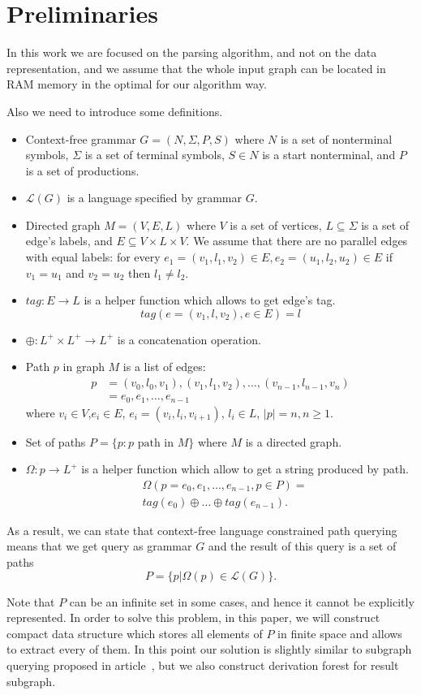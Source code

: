 \section{Preliminaries}

In this work we are focused on the parsing algorithm, and not on the data representation, and we assume that the whole input graph can be located in RAM memory in the optimal for our algorithm way.

Also we need to introduce some definitions.
\begin{itemize}
  \item Context-free grammar $G=(N, \Sigma, P, S)$ where $N$ is a set of nonterminal symbols, $\Sigma$ is a set of terminal symbols, $S \in N$ is a start nonterminal, and $P$ is a set of productions. 
  \item $\mathcal{L}(G)$ is a language specified by grammar $G$.
  \item Directed graph $M = (V,E,L)$ where $V$ is a set of vertices, $L \subseteq \Sigma$ is a set of edge's labels, and $E\subseteq V\times L\times V$. 
  We assume that there are no parallel edges with equal labels: for every $e_1=(v_1,l_1,v_2) \in E, e_2=(u_1,l_2,u_2) \in E$ if $v_1 = u_1$ and $v_2 = u_2$ then $l_1 \neq l_2$.
  \item $tag: E \rightarrow L$ is a helper function which allows to get edge's tag. $$tag(e = (v_1,l,v_2), e \in E) = l$$
  \item $\oplus: L^+ \times L^+ \rightarrow L^+$ is a concatenation operation.
  \item Path $p$ in graph $M$ is a list of edges: 
  \begin{align*}
   p &= (v_0,l_0,v_1),(v_1,l_1,v_2),\dots,(v_{n-1},l_{n-1},v_n) \\
     &= e_0,e_1,\dots,e_{n-1}
  \end{align*}
  where $v_i \in V$,$e_i \in E$, $e_i=(v_i,l_i,v_{i+1})$, $l_i \in L$, $|p| = n, n \geq 1$. 
  \item Set of paths $P = \{p: p \text{ path in } M\}$ where $M$ is a directed graph.
  \item $\Omega: p \rightarrow L^+$ is a helper function which allow to get a string produced by path. 
  \begin{align*}
  & \Omega(p = e_{0},e_{1},\dots,e_{n-1}, p \in P) = \\
  & tag (e_{0}) \oplus \dots \oplus tag (e_{n-1}).
  \end{align*}
\end{itemize}

As a result, we can state that context-free language constrained path querying means that we get query as grammar $G$ and the result of this query is a set of paths $$P=\{p|\Omega(p) \in \mathcal{L}(G)\}.$$

Note that $P$ can be an infinite set in some cases, and hence it cannot be explicitly represented. 
In order to solve this problem, in this paper, we will construct compact data structure which stores all elements of $P$ in finite space and allows to extract every of them.
In this point our solution is slightly similar to subgraph querying proposed in article~\cite{GraphQueryWithEarley}, but we also construct derivation forest for result subgraph.
